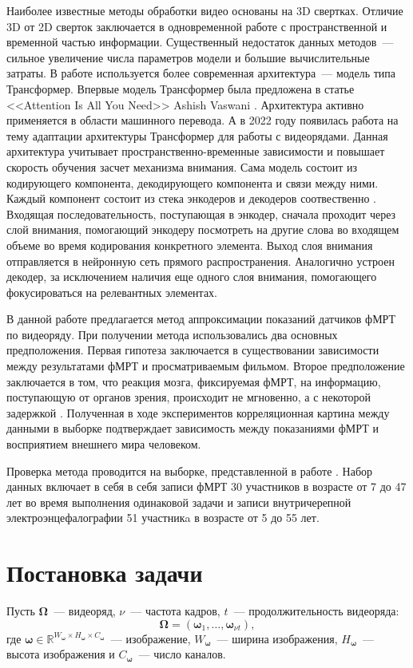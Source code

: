 \documentclass[12pt,twoside]{article}
\begin{document}
Наиболее известные методы обработки видео основаны на 3D свертках. 
Отличие 3D от 2D сверток заключается в одновременной работе с пространственной  
и временной частью информации. Существенный недостаток данных методов~--- 
сильное увеличение числа параметров модели и большие вычислительные затраты.
В работе используется более современная архитектура~--- модель типа Трансформер.
Впервые модель Трансформер была предложена в статье <<Attention Is All You Need>> Ashish Vaswani 
\citep{https://doi.org/10.48550/arxiv.1706.03762}. Архитектура активно применяется в области машинного перевода.
А в 2022 году появилась работа \citep{transformer} на тему адаптации архитектуры Трансформер для работы с видеорядами. 
Данная архитектура учитывает пространственно-временные зависимости и повышает скорость обучения засчет механизма внимания.
Сама модель состоит из кодирующего компонента, декодирующего компонента и связи между ними. Каждый компонент состоит из стека 
энкодеров и декодеров соотвественно \citep{badrinarayanan2017segnet}. 
Входящая последовательность, поступающая в энкодер, сначала проходит через слой внимания, помогающий энкодеру 
посмотреть на другие слова во входящем объеме во время кодирования конкретного элемента. 
Выход слоя внимания отправляется в нейронную сеть прямого распространения. 
Аналогично устроен декодер, за исключением наличия еще одного слоя внимания, помогающего фокусироваться на релевантных элементах.

В данной работе предлагается метод аппроксимации показаний датчиков фМРТ по видеоряду. 
При получении метода использовались два основных предположения. Первая гипотеза заключается в существовании зависимости между результатами фМРТ и просматриваемым фильмом.
Второе предположение заключается в том, что реакция мозга, фиксируемая фМРТ, на информацию, поступающую от органов зрения, происходит не мгновенно, а с некоторой задержкой \citep{Demidov}. 
Полученная в ходе экспериментов корреляционная картина между данными в выборке подтверждает 
зависимость между показаниями фМРТ и восприятием внешнего мира человеком. 

Проверка метода проводится на выборке, представленной в работе \citep{Berezutskaya2022}. 
Набор данных включает в себя в себя записи фМРТ 30 участников в возрасте от 7 до 47 лет во время 
выполнения одинаковой задачи и записи внутричерепной электроэнцефалографии 51 участникa в возрасте от 5 до 55 лет. 


\section{Постановка задачи}
Пусть $\mathbf{\Omega}$~--- видеоряд, $\nu$~--- частота кадров, $t$~--- продолжительность видеоряда:
\begin{equation}
    \bm{\Omega} = (\bm{\omega}_{1}, \dots, \bm{\omega}_{\nu t}),
\end{equation}
где $\bm{\omega} \in \mathbb{R}^{W_{\bm{\omega}} \times H_{\bm{\omega}} \times C_{\bm{\omega}}}$~--- изображение, $W_{\bm{\omega}}$~---
ширина изображения, $H_{\bm{\omega}}$~--- высота изображения и $C_{\bm{\omega}}$~--- число каналов.
\end{document}
